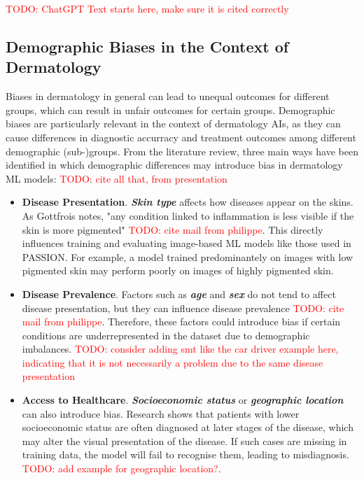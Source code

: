 \documentclass[12pt, a4paper, oneside]{book}   	%
\renewcommand{\todo}[1]{\textcolor{red}{TODO: #1}}
\newcommand{\bolditalic}[1]{\textbf{\textit{{#1}}}}
\begin{document}
					    
		    \todo{ChatGPT Text starts here, make sure it is cited correctly}
		
		\subsection{Demographic Biases in the Context of Dermatology}
		Biases in dermatology in general can lead to unequal outcomes for different groups, which can result in unfair outcomes for certain groups. Demographic biases are particularly relevant in the context of dermatology \glspl{AI}, as they can cause differences in diagnostic accurracy and treatment outcomes among different demographic (sub-)groups.
		From the literature review, three main ways have been identified in which demographic differences may introduce bias in dermatology \gls{ML} models:
		\todo{cite all that, from presentation}
		\begin{itemize}
			\item \textbf{Disease Presentation}. \bolditalic{Skin type} affects how diseases appear on the skins. As Gottfrois notes, "any condition linked to inflammation is less visible if the skin is more pigmented" \todo{cite mail from philippe}. This directly influences training and evaluating image-based \gls{ML} models like those used in PASSION. For example, a model trained predominantely on images with low pigmented skin may perform poorly on images of highly pigmented skin.
			
			\item \textbf{Disease Prevalence}. Factors such as \bolditalic{age} and \bolditalic{sex} do not tend to affect disease presentation, but they can influence disease prevalence \todo{cite mail from philippe}. Therefore, these factors could introduce bias if certain conditions are underrepresented in the dataset due to demographic imbalances. \todo{consider adding smt like the car driver example here, indicating that it is not necessarily a problem due to the same disease presentation}
			
			\item \textbf{Access to Healthcare}. \bolditalic{Socioeconomic status} or \bolditalic{geographic location} can also introduce bias. Research shows that patients with lower socioeconomic status are often diagnosed at later stages of the disease, which may alter the visual presentation of the disease. If such cases are missing in training data, the model will fail to recognise them, leading to misdiagnosis. \todo{add example for geographic location?}.
		\end{itemize}
		
\end{document}
